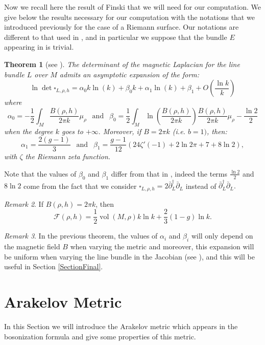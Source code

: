 \documentclass{article}
\newtheorem{theorem}{Theorem}[section]
\theoremstyle{definition}
\theoremstyle{remark}
\newtheorem{Remark}[theorem]{Remark}
\DeclareMathOperator{\vol}{vol}
\begin{document}
Now we recall here the result of Finski \cite{FINSKI20183457} that we will need for our computation. We give below the results necessary for our computation with the notations that we introduced previously for the case of a Riemann surface. Our notations are different to that used in \cite{FINSKI20183457}, and in particular we suppose that the bundle $E$ appearing in \cite{FINSKI20183457} is trivial. 
\begin{theorem}[see {\cite[Th. 1.1 and 1.3]{FINSKI20183457}}]\label{ThFinski}
    The determinant of the magnetic Laplacian for the line bundle $L$ over $M$ admits an asymptotic expansion of the form:
    $$\ln \det \square_{L,\rho,h}=\alpha_{0}k\ln(k)+\beta_{0}k+\alpha_{1}\ln(k)+\beta_{1}+O\left(\frac{\ln k}{k}\right)$$
    where $$\alpha_{0}=-\frac{1}{2}\int_{M} \frac{B(\rho,h)}{2\pi k}\mu_{\rho} ~~ \text{ and } ~~ \beta_{0}=\frac{1}{2}\int_{M}\ln \left( \frac{B(\rho,h)}{2\pi k}\right)\frac{B(\rho,h)}{2\pi k}\mu_{\rho}-\frac{\ln2}{2}$$ when the degree $k$ goes to $+\infty.$ Moreover, if $B=2\pi k$ (i.e. $b=1)$, then: $$\alpha_{1}=\frac{2(g-1)}{3} ~~ \text{ and } ~~ \beta_{1}=\frac{g-1}{12}\left(24\zeta'(-1)+2\ln2\pi+7 +8\ln2\right),$$
    with $\zeta$ the Riemann zeta function.
\end{theorem}
Note that the values of $\beta_{0}$ and $\beta_{1}$ differ from that in \cite{FINSKI20183457}, indeed the terms $\frac{\ln2}{2}$ and $8\ln2$ come from the fact that we consider $\square_{L,\rho,h}=2\bar\partial_{L}^{\dagger}\bar{\partial}_{L}$ instead of $\bar{\partial}_{L}^{\dagger}\bar{\partial}_{L}.$
\begin{Remark}
    If $B(\rho,h)=2\pi k$, then $$\mathcal{F}(\rho,h)=\frac{1}{2}\vol(M,\rho)k\ln k+\frac{2}{3}(1-g)\ln k.$$
\end{Remark}
\begin{Remark}\label{UniformeFinski}
In the previous theorem, the values of $\alpha_{i}$ and $\beta_{i}$ will only depend on the magnetic field $B$ when varying the metric and moreover, this expansion will be uniform when varying the line bundle in the Jacobian (see \cite[Remark 1.2 and Equation (3.54)]{FINSKI20183457}), and this will be useful in Section \ref{SectionFinal}. 
\end{Remark}

\section{Arakelov Metric}\label{SectionArakelovMetric}
In this Section we will introduce the Arakelov metric which appears in the bosonization formula and give some properties of this metric.
\end{document}
